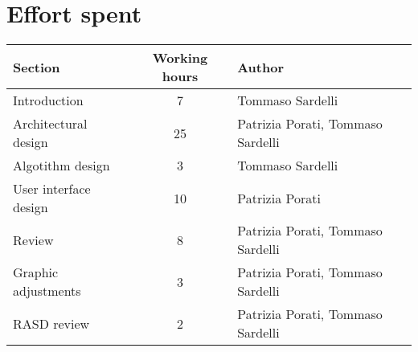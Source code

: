 \pagebreak

\section{Effort spent}

\begin{center}
	\vspace{0.2cm}
	\begin{tabular}{ l c l } 
		\hline
		Section 					& Working hours 	& Author \\ 
		\hline
		Introduction				& 7 				& Tommaso Sardelli	\\
		Architectural design		& 25 				& Patrizia Porati, Tommaso Sardelli	\\
		Algotithm design	 		& 3				 	& Tommaso Sardelli \\ 
		User interface design		& 10 				& Patrizia Porati	\\
		Review						& 8					& Patrizia Porati, Tommaso Sardelli \\
		Graphic adjustments			& 3 				& Patrizia Porati, Tommaso Sardelli \\
		RASD review					& 2 				& Patrizia Porati, Tommaso Sardelli \\
		\hline
	\end{tabular}
\end{center}
